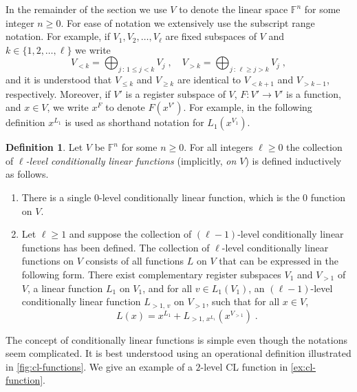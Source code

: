 \documentclass[11pt]{article}
\theoremstyle{definition}
\newtheorem{definition}[theorem]{Definition}
\newcommand{\F}{\ensuremath{\mathbb{F}}}
\begin{document}
In the remainder of the section we use $V$ to denote the linear space $\F^n$ for
some integer $n \geq 0$.
For ease of notation we extensively use the subscript range notation.
For example, if $V_1, V_2, \ldots, V_\ell$ are fixed subspaces of $V$ and $k \in
\{1, 2, \ldots, \ell\}$ we write
\begin{equation*}
  V_{<k} = \bigoplus_{j\,:\,1 \le j<k} V_j\;,\quad
  V_{> k} = \bigoplus_{j\,:\, \ell\ge j > k} V_j\;,
\end{equation*}
and it is understood that $V_{\le k}$ and $V_{\ge k}$ are identical to
$V_{<k+1}$ and $V_{>k-1}$, respectively.
Moreover, if $V'$ is a register subspace of $V$, $F: V' \to V'$ is a function,
and $x \in V$, we write $x^F$ to denote $F(x^{V'})$.
For example, in the following definition $x^{L_1}$ is used as shorthand notation
for $L_1(x^{V_1})$.


\begin{definition}
  \label{def:cl-func}
	Let $V$ be $\F^n$ for some $n\geq 0$.
  For all integers $\ell\geq 0$ the collection of \emph{$\ell$-level
    conditionally linear functions} (implicitly, \emph{on $V$}) is defined
  inductively as follows.
  \begin{enumerate}
  \item There is a single $0$-level conditionally linear function, which is the
    $0$ function on $V$.

  \item Let $\ell \geq 1$ and suppose the collection of $(\ell-1)$-level
    conditionally linear functions has been defined.
    The collection of $\ell$-level conditionally linear functions on $V$ consists
    of all functions $L$ on $V$ that can be expressed in the following form.
    There exist complementary register subspaces $V_1$ and $V_{>1}$ of $V$, a
    linear function $L_1$ on $V_1$, and for all $v \in L_1(V_1)$, an
    $(\ell-1)$-level conditionally linear function $L_{>1,\, v}$ on $V_{>1}$,
    such that for all $x\in V$,
    \begin{equation*}
      L(x) = x^{L_1} + L_{>1,\, x^{L_1}} (x^{V_{>1}})\;.
    \end{equation*}
  \end{enumerate}
\end{definition}

The concept of conditionally linear functions is simple even though the
notations seem complicated.
It is best understood using an operational definition illustrated in
\cref{fig:cl-functions}.
We give an example of a $2$-level CL function in \cref{ex:cl-function}.
\end{document}
